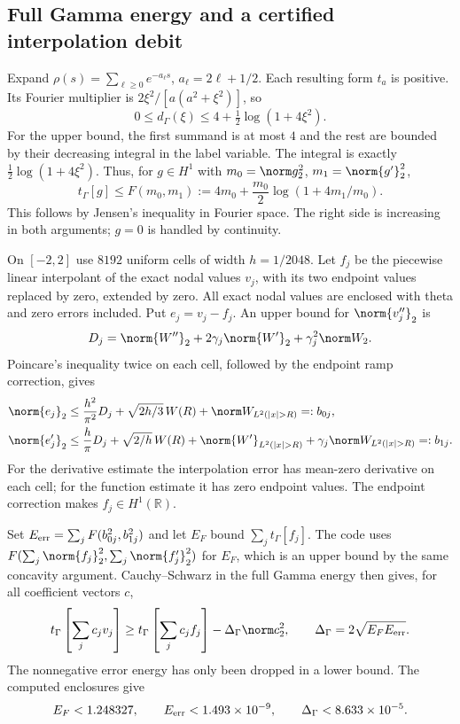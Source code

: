 \documentclass[11pt,a4paper]{article}
\numberwithin{equation}{section}
\theoremstyle{definition}\newtheorem{definition}[theorem]{Definition}
\theoremstyle{remark}\newtheorem{remark}[theorem]{Remark}
\begin{document}
\subsection{Full Gamma energy and a certified interpolation debit}

Expand $\rho(s)=\sum_{\ell\ge0}e^{-a_\ell s}$,
$a_\ell=2\ell+1/2$. Each resulting form $t_a$ is positive. Its Fourier
multiplier is $2\xi^2/[a(a^2+\xi^2)]$, so
\begin{equation}\label{fz:eq:gamma-upper}
 0\le d_\Gamma(\xi)\le4+\tfrac12\log(1+4\xi^2).
\end{equation}
For the upper bound, the first summand is at most $4$ and the rest are
bounded by their decreasing integral in the label variable. The integral
is exactly $\frac12\log(1+4\xi^2)$.
Thus, for $g\in H^1$ with $m_0=\norm g_2^2$, $m_1=\norm{g'}_2^2$,
\begin{equation}\label{fz:eq:jensen}
 t_\Gamma[g]\le F(m_0,m_1):=
 4m_0+\frac{m_0}{2}\log(1+4m_1/m_0).
\end{equation}
This follows by Jensen's inequality in Fourier space. The right side is
increasing in both arguments; $g=0$ is handled by continuity.

On $[-2,2]$ use $8192$ uniform cells of width $h=1/2048$.
Let $f_j$ be the piecewise linear interpolant of the exact nodal values
$v_j$, with its two endpoint values replaced by zero, extended by zero.
All exact nodal values are enclosed with theta and zero errors included.
Put $e_j=v_j-f_j$. An upper bound for $\norm{v_j''}_2$ is
\[
 D_j=\norm{W''}_2+2\gamma_j\norm{W'}_2+\gamma_j^2\norm W_2.
\]
Poincare's inequality twice on each cell, followed by the endpoint ramp
correction, gives
\begin{align}
 \norm{e_j}_2&\le\frac{h^2}{\pi^2}D_j
       +\sqrt{2h/3}\,W(R)+\norm W_{L^2(|x|>R)}=:b_{0j},\\
 \norm{e_j'}_2&\le\frac h\pi D_j+\sqrt{2/h}\,W(R)
       +\norm{W'}_{L^2(|x|>R)}
       +\gamma_j\norm W_{L^2(|x|>R)}=:b_{1j}.\label{fz:eq:interp}
\end{align}
For the derivative estimate the interpolation error has mean-zero
derivative on each cell; for the function estimate it has zero endpoint
values. The endpoint correction makes $f_j\in H^1(\mathbb R)$.

Set $E_{\rm err}=\sum_jF(b_{0j}^2,b_{1j}^2)$ and let
$E_F$ bound $\sum_jt_\Gamma[f_j]$. The code uses
$F(\sum_j\norm{f_j}_2^2,\sum_j\norm{f_j'}_2^2)$ for $E_F$,
which is an upper bound by the same concavity argument. Cauchy--Schwarz
in the full Gamma energy then gives, for all coefficient vectors $c$,
\begin{equation}\label{fz:eq:debit}
 t_\Gamma\left[\sum_jc_jv_j\right]
 \ge t_\Gamma\left[\sum_jc_jf_j\right]
       -\Delta_\Gamma\norm c_2^2,
 \qquad \Delta_\Gamma=2\sqrt{E_FE_{\rm err}}.
\end{equation}
The nonnegative error energy has only been dropped in a lower bound.
The computed enclosures give
\[
 E_F<1.248327,\qquad E_{\rm err}<1.493\times10^{-9},\qquad
 \Delta_\Gamma<8.633\times10^{-5}.
\]
\end{document}
